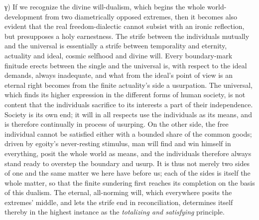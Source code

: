 \documentclass[12pt]{book}
\begin{document}
γ) If we recognize the divine will-dualism, which begins the whole
world-development from two diametrically opposed extremes, then it becomes
also evident that the real freedom-dialectic cannot subsist with an ironic
reflection, but presupposes a holy earnestness. The strife between the
individuals mutually and the universal is essentially a strife between
temporality and eternity, actuality and ideal, cosmic selfhood and divine
will. Every boundary-mark finitude erects between the single and the
universal is, with respect to the ideal demands, always inadequate, and what
from the ideal's point of view is an eternal right becomes from the finite
actuality's side a usurpation. The universal, which finds its higher
expression in the different forms of human society, is not content that the
individuals sacrifice to its interests a part of their independence. Society
is its own end; it will in all respects use the individuals as its means,
and is therefore continually in process of usurping. On the other side, the
free individual cannot be satisfied either with a bounded share of the
common goods; driven by egoity's never-resting stimulus, man will find and
win himself in everything, posit the whole world as means, and the
individuals therefore always stand ready to overstep the boundary and usurp.
It is thus not merely two sides of one and the same matter we here have
before us; each of the sides is itself the whole matter, so that the finite
sundering first reaches its completion on the basis of this dualism. The
eternal, all-norming will, which everywhere posits the extremes' middle, and
lets the strife end in reconciliation, determines itself thereby in the
highest instance as the \emph{totalizing and satisfying} principle.
\end{document}
